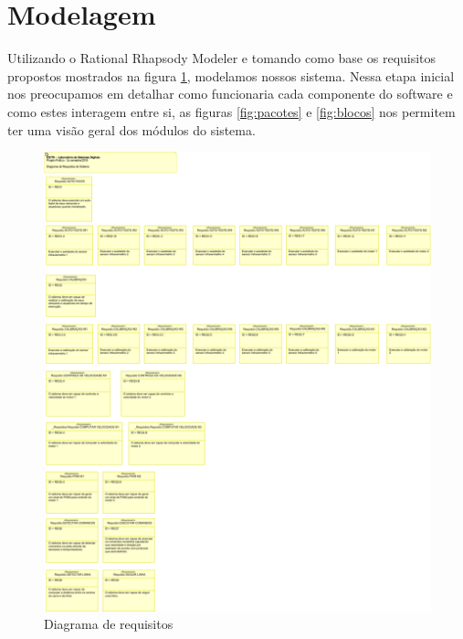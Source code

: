 \documentclass{article}
\begin{document}
\section{Modelagem}
Utilizando o Rational Rhapsody Modeler e tomando como base os requisitos propostos mostrados na figura \ref{fig:requisitos}, modelamos nossos sistema. Nessa etapa inicial nos preocupamos em detalhar como funcionaria cada componente do software e como estes interagem entre si, as figuras \ref{fig:pacotes} e \ref{fig:blocos} nos permitem ter uma visão geral dos módulos do sistema.
\begin{figure}[H]
	\centering
	\includegraphics[width=1.3\linewidth, center]{requisitos}
	\caption{Diagrama de requisitos}
	\label{fig:requisitos}
\end{figure}
\end{document}
